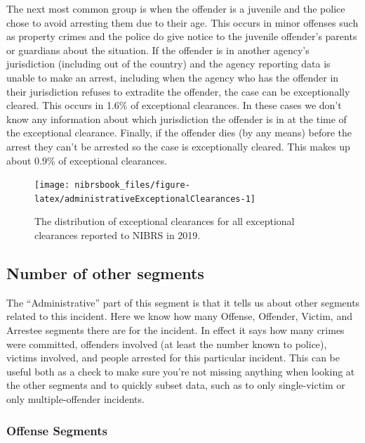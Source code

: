 \documentclass[
  12pt,
  openany]{book}
\begin{document}
The next most common group is when the offender is a juvenile and the police chose to avoid arresting them due to their age. This occurs in minor offenses such as property crimes and the police do give notice to the juvenile offender's parents or guardians about the situation. If the offender is in another agency's jurisdiction (including out of the country) and the agency reporting data is unable to make an arrest, including when the agency who has the offender in their jurisdiction refuses to extradite the offender, the case can be exceptionally cleared. This occurs in 1.6\% of exceptional clearances. In these cases we don't know any information about which jurisdiction the offender is in at the time of the exceptional clearance. Finally, if the offender dies (by any means) before the arrest they can't be arrested so the case is exceptionally cleared. This makes up about 0.9\% of exceptional clearances.

\begin{figure}

{\centering \texttt{[image: nibrsbook\_files/figure-latex/administrativeExceptionalClearances-1]} 

}

\caption{The distribution of exceptional clearances for all exceptional clearances reported to NIBRS in 2019.}\label{fig:administrativeExceptionalClearances}
\end{figure}

\hypertarget{number-of-other-segments}{%
\subsection{Number of other segments}\label{number-of-other-segments}}

The ``Administrative'' part of this segment is that it tells us about other segments related to this incident. Here we know how many Offense, Offender, Victim, and Arrestee segments there are for the incident. In effect it says how many crimes were committed, offenders involved (at least the number known to police), victims involved, and people arrested for this particular incident. This can be useful both as a check to make sure you're not missing anything when looking at the other segments and to quickly subset data, such as to only single-victim or only multiple-offender incidents.

\hypertarget{offense-segments}{%
\subsubsection{Offense Segments}\label{offense-segments}}
\end{document}
